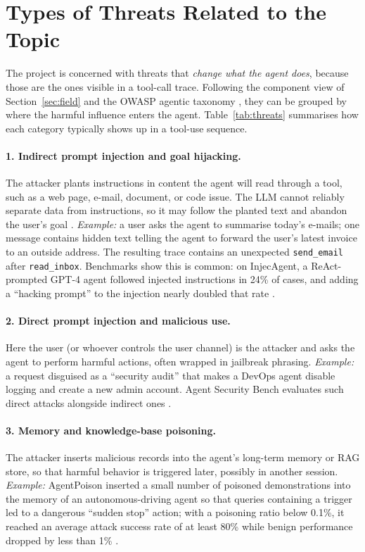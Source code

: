 \documentclass[11pt,a4paper]{article}
\begin{document}
\section{Types of Threats Related to the Topic}
\label{sec:threats}

The project is concerned with threats that \emph{change what the agent does}, because those are the ones visible in a tool-call trace. Following the component view of Section~\ref{sec:field} and the OWASP agentic taxonomy \citep{owasp2025agentic}, they can be grouped by where the harmful influence enters the agent. Table~\ref{tab:threats} summarises how each category typically shows up in a tool-use sequence.

\paragraph{1. Indirect prompt injection and goal hijacking.} The attacker plants instructions in content the agent will read through a tool, such as a web page, e-mail, document, or code issue. The LLM cannot reliably separate data from instructions, so it may follow the planted text and abandon the user's goal \citep{greshake2023indirect}. \emph{Example:} a user asks the agent to summarise today's e-mails; one message contains hidden text telling the agent to forward the user's latest invoice to an outside address. The resulting trace contains an unexpected \texttt{send\_email} after \texttt{read\_inbox}. Benchmarks show this is common: on InjecAgent, a ReAct-prompted GPT-4 agent followed injected instructions in 24\% of cases, and adding a ``hacking prompt'' to the injection nearly doubled that rate \citep{zhan2024injecagent}.

\paragraph{2. Direct prompt injection and malicious use.} Here the user (or whoever controls the user channel) is the attacker and asks the agent to perform harmful actions, often wrapped in jailbreak phrasing. \emph{Example:} a request disguised as a ``security audit'' that makes a DevOps agent disable logging and create a new admin account. Agent Security Bench evaluates such direct attacks alongside indirect ones \citep{zhang2025asb}.

\paragraph{3. Memory and knowledge-base poisoning.} The attacker inserts malicious records into the agent's long-term memory or RAG store, so that harmful behavior is triggered later, possibly in another session. \emph{Example:} AgentPoison inserted a small number of poisoned demonstrations into the memory of an autonomous-driving agent so that queries containing a trigger led to a dangerous ``sudden stop'' action; with a poisoning ratio below 0.1\%, it reached an average attack success rate of at least 80\% while benign performance dropped by less than 1\% \citep{chen2024agentpoison}.
\end{document}
